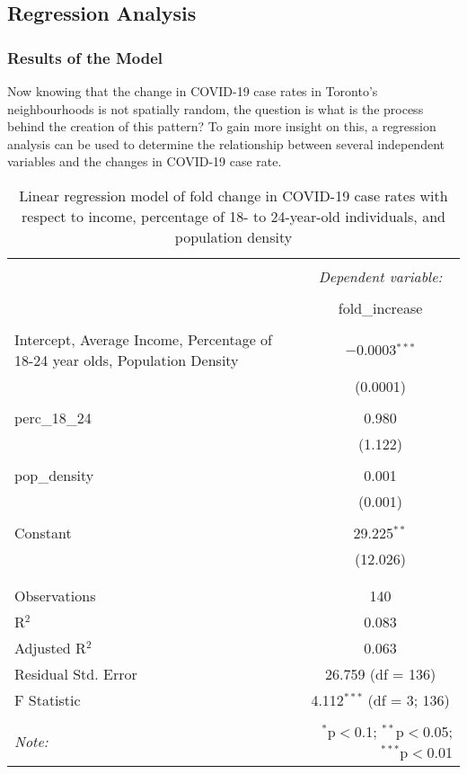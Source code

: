 \documentclass[]{article}
\begin{document}
\hypertarget{regression-analysis}{%
\subsection{Regression Analysis}\label{regression-analysis}}

\hypertarget{results-of-the-model}{%
\subsubsection{Results of the Model}\label{results-of-the-model}}

Now knowing that the change in COVID-19 case rates in Toronto's
neighbourhoods is not spatially random, the question is what is the
process behind the creation of this pattern? To gain more insight on
this, a regression analysis can be used to determine the relationship
between several independent variables and the changes in COVID-19 case
rate.

\begin{table}[!htbp] \centering 
  \caption{Linear regression model of fold change in COVID-19 case rates with respect to income, percentage of 18- to 24-year-old individuals, and population density} 
  \label{} 
\begin{tabular}{@{\extracolsep{5pt}}lc} 
\\[-1.8ex]\hline 
\hline \\[-1.8ex] 
 & \multicolumn{1}{c}{\textit{Dependent variable:}} \\ 
\cline{2-2} 
\\[-1.8ex] & fold\_increase \\ 
\hline \\[-1.8ex] 
 Intercept, Average Income, Percentage of 18-24 year olds, Population Density & $-$0.0003$^{***}$ \\ 
  & (0.0001) \\ 
  & \\ 
 perc\_18\_24 & 0.980 \\ 
  & (1.122) \\ 
  & \\ 
 pop\_density & 0.001 \\ 
  & (0.001) \\ 
  & \\ 
 Constant & 29.225$^{**}$ \\ 
  & (12.026) \\ 
  & \\ 
\hline \\[-1.8ex] 
Observations & 140 \\ 
R$^{2}$ & 0.083 \\ 
Adjusted R$^{2}$ & 0.063 \\ 
Residual Std. Error & 26.759 (df = 136) \\ 
F Statistic & 4.112$^{***}$ (df = 3; 136) \\ 
\hline 
\hline \\[-1.8ex] 
\textit{Note:}  & \multicolumn{1}{r}{$^{*}$p$<$0.1; $^{**}$p$<$0.05; $^{***}$p$<$0.01} \\ 
\end{tabular} 
\end{table}
\end{document}
